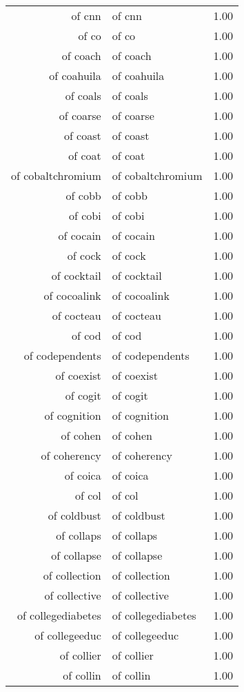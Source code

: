 \begin{table}[ht]
\begin{tabular}{rlr}
  of cnn & of cnn & 1.00 \\ 
  of co & of co & 1.00 \\ 
  of coach & of coach & 1.00 \\ 
  of coahuila & of coahuila & 1.00 \\ 
  of coals & of coals & 1.00 \\ 
  of coarse & of coarse & 1.00 \\ 
  of coast & of coast & 1.00 \\ 
  of coat & of coat & 1.00 \\ 
  of cobaltchromium & of cobaltchromium & 1.00 \\ 
  of cobb & of cobb & 1.00 \\ 
  of cobi & of cobi & 1.00 \\ 
  of cocain & of cocain & 1.00 \\ 
  of cock & of cock & 1.00 \\ 
  of cocktail & of cocktail & 1.00 \\ 
  of cocoalink & of cocoalink & 1.00 \\ 
  of cocteau & of cocteau & 1.00 \\ 
  of cod & of cod & 1.00 \\ 
  of codependents & of codependents & 1.00 \\ 
  of coexist & of coexist & 1.00 \\ 
  of cogit & of cogit & 1.00 \\ 
  of cognition & of cognition & 1.00 \\ 
  of cohen & of cohen & 1.00 \\ 
  of coherency & of coherency & 1.00 \\ 
  of coica & of coica & 1.00 \\ 
  of col & of col & 1.00 \\ 
  of coldbust & of coldbust & 1.00 \\ 
  of collaps & of collaps & 1.00 \\ 
  of collapse & of collapse & 1.00 \\ 
  of collection & of collection & 1.00 \\ 
  of collective & of collective & 1.00 \\ 
  of collegediabetes & of collegediabetes & 1.00 \\ 
  of collegeeduc & of collegeeduc & 1.00 \\ 
  of collier & of collier & 1.00 \\ 
  of collin & of collin & 1.00 \\ 

\end{tabular}
\end{table}
